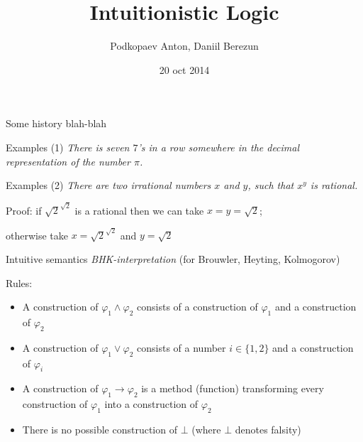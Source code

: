 \documentclass[sans]{beamer}
\begin{document}
\title
[Intuitionistic Logic]
{Intuitionistic Logic}

\author
[JBStuff]{Podkopaev Anton, Daniil Berezun}
\date [20-10-14]{20 oct 2014}

\begin{frame}[plain]
	\titlepage
\end{frame}

\begin{frame}{Some history blah-blah}
\end{frame}

\begin{frame}{Examples (1)}
  \emph{
    There is seven $7$'s in a row somewhere in
    the decimal representation
    of the number $\pi$.
  }
\end{frame}

\begin{frame}{Examples (2)}
  \emph{
    There are two irrational numbers $x$ and $y$, such that $x^y$ is rational.
  }
  \vfill
  \begin{block}{Proof:}
    if $\sqrt{2}^{\sqrt{2}}$ is a rational then we can take $x = y = \sqrt{2}$;

    otherwise take $x = \sqrt{2}^{\sqrt{2}}$ and $y = \sqrt{2}$
  \end{block}
\end{frame}

\begin{frame}{Intuitive semantics}
  \emph{BHK-interpretation} (for Brouwler, Heyting, Kolmogorov)

  \begin{block}{Rules:}
    \begin{itemize}
      \item A construction of $\varphi_1 \wedge \varphi_2$ consists of
            a construction of $\varphi_1$ and a construction of $\varphi_2$
      \item A construction of $\varphi_1 \vee \varphi_2$ consists of a
            number $i \in \{1, 2\}$ and a construction of $\varphi_i$
      \item A construction of $\varphi_1 \to \varphi_2$ is a method (function)
            transforming every construction of $\varphi_1$ into a construction
            of $\varphi_2$
      \item There is no possible construction of $\bot$ (where $\bot$ denotes falsity)
    \end{itemize}
  \end{block}
\end{frame}
\end{document}

